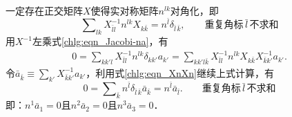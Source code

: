 一定存在{\kaishu 正交矩阵}$X$使得实对称矩阵$n^{lk}$对角化\cite[p.289]{qiuws-2018-v1}，即
\begin{equation}\label{chlg:eqn_XnXn}
	\sum\nolimits_{l k}X^{-1}_{\bar{l} l} n^{lk} X_{k \bar{k}}= n^{\bar{l}} \delta_{\bar{l}\, \bar{k}},
	\qquad \text{重复角标}\,\bar{l}\,\text{不求和}
\end{equation}
用$X^{-1}$左乘式\eqref{chlg:eqn_Jacobi-na}，有
\begin{align*}
	0= \sum\nolimits_{kk'l} X^{-1}_{\bar{l} l} n^{lk} \delta_{k k'} a_{k'}
	=\sum\nolimits_{kk'l\bar{k}} X^{-1}_{\bar{l} l} n^{lk} X_{k \bar{k}}  X^{-1}_{\bar{k} k'} a_{k'} .
\end{align*}
令$\bar{a}_{\bar{k}} \equiv \sum_{k'}X^{-1}_{\bar{k} k'} a_{k'}$，利用式\eqref{chlg:eqn_XnXn}继续上式计算，有
\begin{equation}\label{chlg:eqn_Dnakb}
	0=\sum\nolimits_{\bar{k}} n^{\bar{l}} \delta_{\bar{l}\, \bar{k}}  \bar{a}_{\bar{k}}
	= n^{\bar{l}} \bar{a}_{\bar{l}}. 	\qquad \text{重复角标}\,\bar{l}\,\text{不求和}
\end{equation}
即：$n^1 \bar{a}_1 = 0$且$n^2 \bar{a}_2 = 0$且$n^3 \bar{a}_3 = 0$．

